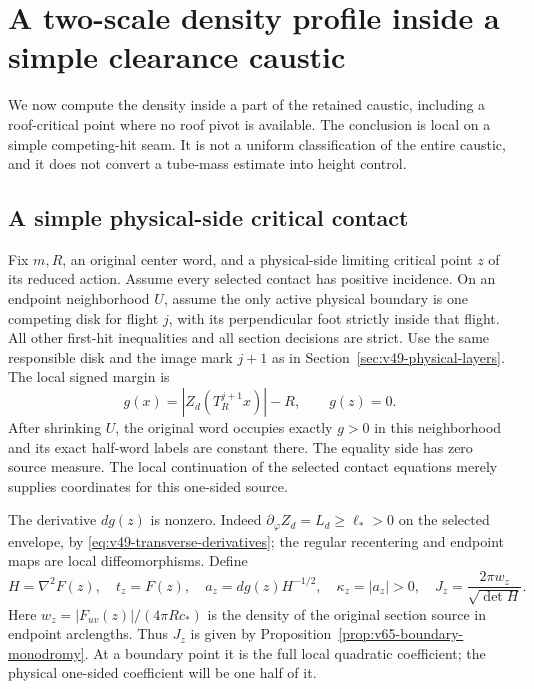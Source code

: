 \section{A two-scale density profile inside a simple clearance caustic}
\label{sec:v65-simple-caustic-profile}
We now compute the density inside a part of the retained caustic,
including a roof-critical point where no roof pivot is available.
The conclusion is local on a simple competing-hit seam. It is not a
uniform classification of the entire caustic, and it does not convert
a tube-mass estimate into height control.

\subsection{A simple physical-side critical contact}
Fix $m,R$, an original center word, and a physical-side limiting
critical point $z$ of its reduced action. Assume every selected
contact has positive incidence. On an endpoint neighborhood $U$,
assume the only active physical boundary is one competing disk for
flight $j$, with its perpendicular foot strictly inside that flight.
All other first-hit inequalities and all section decisions are strict.
Use the same responsible disk and the image mark $j+1$ as in
Section~\ref{sec:v49-physical-layers}. The local signed margin is
\begin{equation}\label{eq:v65-simple-margin}
 g(x)=|Z_d(T_R^{j+1}x)|-R,\qquad g(z)=0.
\end{equation}
After shrinking $U$, the original word occupies exactly $g>0$ in
this neighborhood and its exact half-word labels are constant there.
The equality side has zero source measure. The local continuation of
the selected contact equations merely supplies coordinates for this
one-sided source.

The derivative $dg(z)$ is nonzero. Indeed
$\partial_\varphi Z_d=L_d\ge\ell_*>0$ on the selected envelope,
by \eqref{eq:v49-transverse-derivatives}; the regular recentering and
endpoint maps are local diffeomorphisms. Define
\begin{equation}\label{eq:v65-profile-scale}
 H=\nabla^2F(z),\quad t_z=F(z),\quad
 a_z=dg(z)H^{-1/2},\quad \kappa_z=|a_z|>0,\quad
 J_z=\frac{2\pi w_z}{\sqrt{\det H}}.
\end{equation}
Here $w_z=|F_{uv}(z)|/(4\pi R c_*)$ is the density of the original
section source in endpoint arclengths. Thus $J_z$ is given by
Proposition~\ref{prop:v65-boundary-monodromy}. At a boundary point
it is the full local quadratic coefficient; the physical one-sided
coefficient will be one half of it.

